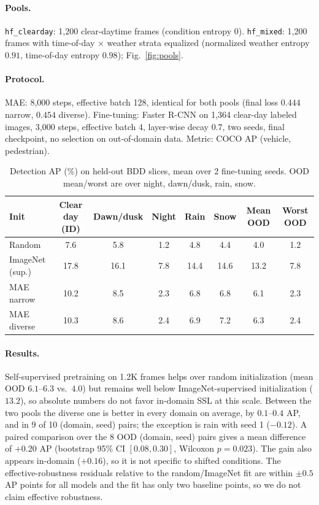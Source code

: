 \documentclass{article}
\begin{document}
\paragraph{Pools.} \texttt{hf\_clearday}: 1{,}200 clear-daytime frames (condition entropy 0). \texttt{hf\_mixed}: 1{,}200
frames with time-of-day $\times$ weather strata equalized (normalized weather entropy $0.91$, time-of-day entropy $0.98$); Fig.~\ref{fig:pools}.
\paragraph{Protocol.} MAE: 8{,}000 steps, effective batch 128, identical for both pools (final loss $0.444$ narrow, $0.454$ diverse).
Fine-tuning: Faster R-CNN on 1{,}364 clear-day labeled images, 3{,}000 steps, effective batch 4, layer-wise decay $0.7$, two
seeds, final checkpoint, no selection on out-of-domain data. Metric: COCO AP (vehicle, pedestrian).
\begin{table}[h]
  \caption{Detection AP (\%) on held-out BDD slices, mean over 2 fine-tuning seeds. OOD mean/worst are over night, dawn/dusk, rain, snow.}
  \label{tab:main}
  \centering
  \small
  \begin{tabular}{lccccccc}
    \toprule
    Init & Clear day (ID) & Dawn/dusk & Night & Rain & Snow & Mean OOD & Worst OOD \\
    \midrule
    Random          & 7.6 & 5.8 & 1.2 & 4.8 & 4.4 & 4.0 & 1.2 \\
    ImageNet (sup.) & 17.8 & 16.1 & 7.8 & 14.4 & 14.6 & 13.2 & 7.8 \\
    MAE narrow      & 10.2 & 8.5 & 2.3 & 6.8 & 6.8 & 6.1 & 2.3 \\
    MAE diverse     & 10.3 & 8.6 & 2.4 & 6.9 & 7.2 & 6.3 & 2.4 \\
    \bottomrule
  \end{tabular}
\end{table}
\paragraph{Results.} Self-supervised pretraining on 1.2K frames helps over random initialization (mean OOD $6.1$--$6.3$ vs.\ $4.0$)
but remains well below ImageNet-supervised initialization ($13.2$), so absolute numbers do not favor in-domain SSL at this scale.
Between the two pools the diverse one is better in every domain on average, by $0.1$--$0.4$ AP, and in 9 of 10
(domain, seed) pairs; the exception is rain with seed 1 ($-0.12$). A paired comparison over the 8 OOD (domain, seed) pairs gives a mean difference of
$+0.20$ AP (bootstrap 95\% CI $[0.08, 0.30]$, Wilcoxon $p=0.023$). The gain also appears in-domain ($+0.16$), so it is not specific to
shifted conditions. The effective-robustness residuals relative to the random/ImageNet fit are within $\pm0.5$ AP points for all
models and the fit has only two baseline points, so we do not claim effective robustness.
\end{document}
